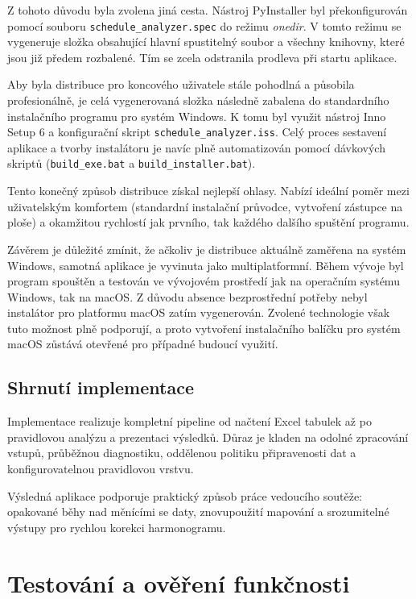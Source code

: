 \documentclass[czech, kiv, ba, he, iso690alph, pdf]{fasthesis}
\begin{document}
			Z tohoto důvodu byla zvolena jiná cesta. Nástroj PyInstaller byl překonfigurován pomocí souboru \texttt{schedule\_analyzer.spec} do režimu \textit{onedir}. V tomto režimu se vygeneruje složka obsahující hlavní spustitelný soubor a všechny knihovny, které jsou již předem rozbalené. Tím se zcela odstranila prodleva při startu aplikace. 
		
			Aby byla distribuce pro koncového uživatele stále pohodlná a působila profesionálně, je celá vygenerovaná složka následně zabalena do standardního instalačního programu pro systém Windows. K tomu byl využit nástroj Inno Setup 6 a konfigurační skript \texttt{schedule\_analyzer.iss}. Celý proces sestavení aplikace a tvorby instalátoru je navíc plně automatizován pomocí dávkových skriptů (\texttt{build\_exe.bat} a \texttt{build\_installer.bat}).
		
			Tento konečný způsob distribuce získal nejlepší ohlasy. Nabízí ideální poměr mezi uživatelským komfortem (standardní instalační průvodce, vytvoření zástupce na ploše) a okamžitou rychlostí jak prvního, tak každého dalšího spuštění programu.
			
			Závěrem je důležité zmínit, že ačkoliv je distribuce aktuálně zaměřena na systém Windows, samotná aplikace je vyvinuta jako multiplatformní. Během vývoje byl program spouštěn a testován ve vývojovém prostředí jak na operačním systému Windows, tak na macOS. Z důvodu absence bezprostřední potřeby nebyl instalátor pro platformu macOS zatím vygenerován. Zvolené technologie však tuto možnost plně podporují, a proto vytvoření instalačního balíčku pro systém macOS zůstává otevřené pro případné budoucí využití.
			
	
		\section{Shrnutí implementace}
			Implementace realizuje kompletní pipeline od načtení Excel tabulek až po pravidlovou analýzu a prezentaci výsledků. Důraz je kladen na odolné zpracování vstupů, průběžnou diagnostiku, oddělenou politiku připravenosti dat a konfigurovatelnou pravidlovou vrstvu.
	
			Výsledná aplikace podporuje praktický způsob práce vedoucího soutěže: opakované běhy nad měnícími se daty, znovupoužití mapování a srozumitelné výstupy pro rychlou korekci harmonogramu.

	\chapter{Testování a ověření funkčnosti}
\end{document}
